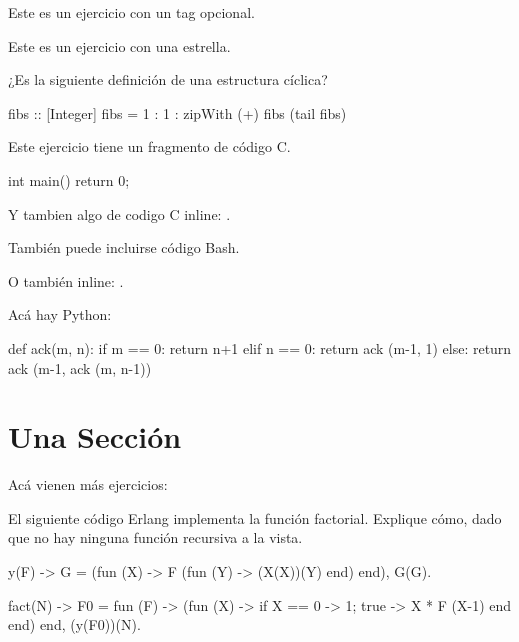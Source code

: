 \documentclass[debug,practica]{lcc}
\begin{document}
\begin{ejercicio}[(difícil)]
    Este es un ejercicio con un tag opcional.
\end{ejercicio}

\begin{ejercicio}[\unskip*]
    Este es un ejercicio con una estrella.
\end{ejercicio}

\begin{ejercicio}
    ¿Es la siguiente definición de  una estructura cíclica?
    \begin{Hask}
fibs :: [Integer]
fibs = 1 : 1 : zipWith (+) fibs (tail fibs)
    \end{Hask}
\end{ejercicio}

\begin{ejercicio}
    Este ejercicio tiene un fragmento de código C.
    \begin{C}
int main()
{
    return 0;
}
    \end{C}
    Y tambien algo de codigo C inline: .
\end{ejercicio}

\begin{ejercicio}
    También puede incluirse código Bash.
    O también inline: \bash{:()\{ :|:& \};:}.
\end{ejercicio}

\begin{ejercicio}
    Acá hay Python:
    \begin{Py}
def ack(m, n):
    if m == 0:
        return n+1
    elif n == 0:
        return ack (m-1, 1)
    else:
        return ack (m-1, ack (m, n-1))
    \end{Py}
\end{ejercicio}

\section{Una Sección}

Acá vienen más ejercicios:

\begin{ejercicio}
    El siguiente código Erlang implementa la función factorial.
    Explique cómo, dado que no hay ninguna función recursiva a la vista.
    \begin{Erl}
y(F) ->
	G = (fun (X) -> F (fun (Y) -> (X(X))(Y) end) end),
	G(G).

fact(N) ->
	F0 = fun (F) -> (fun (X) -> if X == 0 -> 1; true -> X * F (X-1) end end) end,
	(y(F0))(N).
    \end{Erl}
\end{ejercicio}
\end{document}
